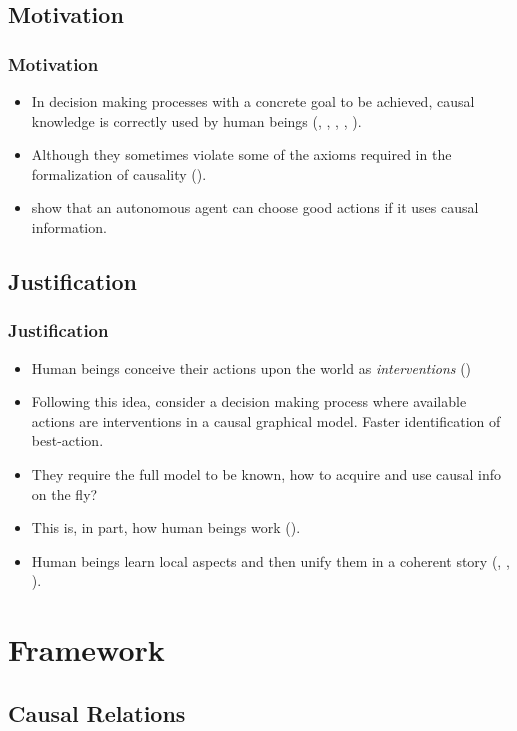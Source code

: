 \documentclass{beamer}
\theoremstyle{plain}
\begin{document}
	\subsection{Motivation} 
	\begin{frame}
	\frametitle{Motivation}
	\begin{itemize}
	\item In decision making processes with a concrete goal to be achieved, causal knowledge is correctly used by human beings (\cite{sloman2006causal}, \cite{nichols2007decision}, \cite{meder2010observing}, \cite{hagmayer2013repeated}, \cite{danks2014unifying}).
	\item Although they sometimes violate some of the axioms required in the formalization of causality (\cite{rottman2014reasoning}).
	\item \cite{lattimoreNIPS2016} show that an autonomous agent can choose good actions if it uses causal information.
	\end{itemize}
	\end{frame}
	\subsection{Justification}
	\begin{frame}
	\frametitle{Justification}
	\begin{itemize}
	\item Human beings conceive their actions upon the world as \textit{interventions} (\cite{hagmayer2009decision})
	\item Following this idea, \cite{lattimoreNIPS2016} consider a decision making process where available actions are interventions in a causal graphical model. Faster identification of best-action.
	\item They require the full model to be known, how to acquire and use causal info on the fly? 
	\item This is, in part, how human beings work (\cite{hagmayer2013repeated}).
	\item Human beings learn local aspects and then unify them in a coherent story (\cite{fernbach2009causal}, \cite{waldmann2008causal}, \cite{wellen2012learning}).
	\end{itemize}
	\end{frame}
\section{Framework}
	\subsection{Causal Relations}
\end{document}

